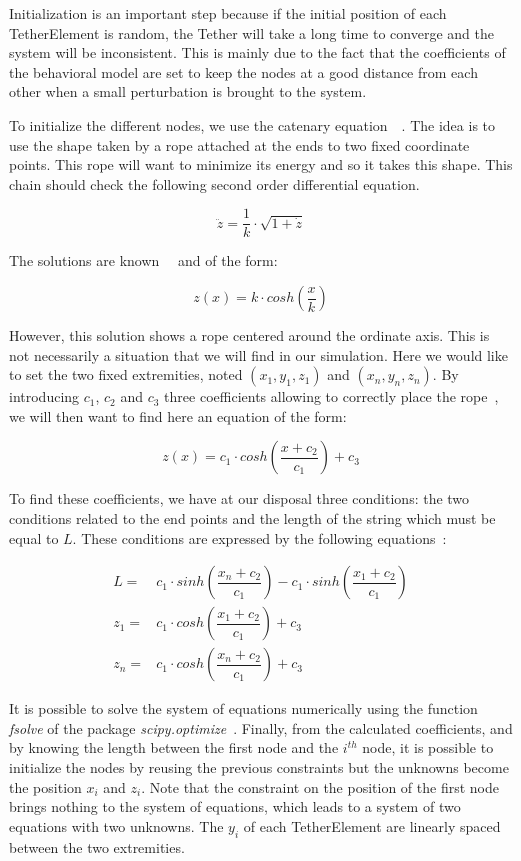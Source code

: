 Initialization is an important step because if the initial position of each TetherElement is random, the Tether will take a long time to converge and the system will be inconsistent. This is mainly due to the fact that the coefficients of the behavioral model are set to keep the nodes at a good distance from each other when a small perturbation is brought to the system.

To initialize the different nodes, we use the catenary equation~\cite{obrien_general_1968}~\cite{ren_parabolic_2008}. The idea is to use the shape taken by a rope attached at the ends to two fixed coordinate points. This rope will want to minimize its energy and so it takes this shape. This chain should check the following second order differential equation.

$$\ddot{z} = \frac{1}{k} \cdot \sqrt{1 + \dot{z}}$$

The solutions are known~\cite{obrien_general_1968}~\cite{ren_parabolic_2008} and of the form:

$$z(x) = k \cdot cosh\left(\frac{x}{k}\right)$$

However, this solution shows a rope centered around the ordinate axis. This is not necessarily a situation that we will find in our simulation. Here we would like to set the two fixed extremities, noted $(x_1, y_1, z_1)$ and $(x_n, y_n, z_n)$. By introducing $c_1$, $c_2$ and $c_3$ three coefficients allowing to correctly place the rope~\cite{ren_parabolic_2008}, we will then want to find here an equation of the form:

$$z(x) = c_1 \cdot cosh\left(\frac{x+c_2}{c_1}\right)+c_3$$

To find these coefficients, we have at our disposal three conditions: the two conditions related to the end points and the length of the string which must be equal to $L$. These conditions are expressed by the following equations~\cite{ren_parabolic_2008}:

\begin{align*}
    L = & c_1 \cdot sinh\left(\dfrac{x_n+c_2}{c_1}\right) - c_1 \cdot sinh\left(\dfrac{x_1+c_2}{c_1}\right) \\
    z_1 = & c_1 \cdot cosh\left(\dfrac{x_1+c_2}{c_1}\right)+c_3 \\
    z_n = & c_1 \cdot cosh\left(\dfrac{x_n+c_2}{c_1}\right)+c_3
\end{align*}

It is possible to solve the system of equations numerically using the function \textit{fsolve} of the package \textit{scipy.optimize}~\cite{scipy}. Finally, from the calculated coefficients, and by knowing the length between the first node and the $i^{th}$ node, it is possible to initialize the nodes by reusing the previous constraints but the unknowns become the position $x_i$ and $z_i$. Note that the constraint on the position of the first node brings nothing to the system of equations, which leads to a system of two equations with two unknowns. The $y_i$ of each TetherElement are linearly spaced between the two extremities.